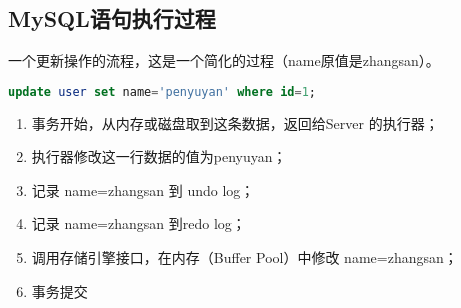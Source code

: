 \documentclass[../../../interview-questions.tex]{subfiles}
\begin{document}
\subsection{MySQL语句执行过程}

一个更新操作的流程，这是一个简化的过程（name原值是zhangsan）。

\begin{lstlisting}[language=SQL]
update user set name='penyuyan' where id=1;
\end{lstlisting}

\begin{enumerate}
    \item {事务开始，从内存或磁盘取到这条数据，返回给Server 的执行器；}
    \item {执行器修改这一行数据的值为penyuyan；}
    \item {记录 name=zhangsan 到 undo log；}
    \item {记录 name=zhangsan 到redo log；}
    \item {调用存储引擎接口，在内存（Buffer Pool）中修改 name=zhangsan；}
    \item {事务提交}
\end{enumerate}
\end{document}
